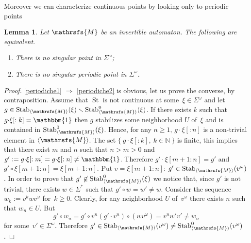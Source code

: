 \documentclass{amsart}
\newtheorem{lemma}[theorem]{Lemma}
\begin{document}
Moreover we can characterize continuous points by looking only to periodic points
\begin{lemma}\label{lemmaperiodiche}
Let ${{{\mathrsfs{{M}}}}}$ be an invertible automaton. The following are equivalent.
\begin{enumerate}[label=(\roman{enumi})]
\item \label{periodiche1} There is no singular point in ${{{\Sigma}}}^{\omega}$;
\item \label{periodiche2} There is no singular periodic point in ${{{\Sigma}}}^{\omega}$.
\end{enumerate}
\end{lemma}
\begin{proof}
 \ref{periodiche1} $\Rightarrow$ \ref{periodiche2}  is obvious, let us prove the converse, by contraposition.
 Assume that $\operatorname{St}$ is not continuous at some~$\xi\in {{{\Sigma}}}^{\omega}$ and let $g\in \operatorname{Stab}_{{{\langle}{{\mathrsfs{{{M}}}}}{\rangle}}}(\xi)\smallsetminus \operatorname{Stab}_{{{\langle}{{\mathrsfs{{{M}}}}}{\rangle}}}^{0}(\xi)$. If there exists $k$ such that $g{{{\cdot}}} \xi[:k]=\operatorname{\mathbbm{1}}$ then $g$ stabilizes some neighborhood $U$ of~$\xi$ and  is contained in $\operatorname{Stab}_{{{\langle}{{\mathrsfs{{{M}}}}}{\rangle}}}^{0}(\xi)$. Hence, for any $n\geq 1$, $g{{{\cdot}}} \xi[:n]$ is a non-trivial element in ${{{\langle}{{\mathrsfs{{{M}}}}}{\rangle}}}$. The set $\{\ g{{{\cdot}}} \xi[:k], \ k\in \mathbb{N}\ \}$ is finite, this implies that there exist $m$ and $n$ such that $n>m>0$ and  $g':=g{{{\cdot}}} \xi[:m]= g{{{\cdot}}} \xi[:n]\neq \operatorname{\mathbbm{1}}$. Therefore $g'{{{\cdot}}} \xi[m+1:n]=g'$ and $g'{{{\circ}}} \xi[m+1:n]=\xi[m+1:n]$. Put $v=\xi[m+1:n]$: $g'\in \operatorname{Stab}_{{{\langle}{{\mathrsfs{{{M}}}}}{\rangle}}}(v^{\omega})$. In order to prove that $g'\not\in \operatorname{Stab}_{{{\langle}{{\mathrsfs{{{M}}}}}{\rangle}}}^{0}(\xi)$ we notice that, since $g'$ is not trivial, there exists $w\in {{{\Sigma}}}^{\ast}$ such that $g'{{{\circ}}} w=w'\neq w$.  Consider the sequence $w_k:=v^kwv^{\omega}$ for~$k \geq 0$. Clearly, for any neighborhood $U$ of~$v^{\omega}$ there exists $n$ such that $w_n\in U$. But
$$
g'{{{\circ}}} w_n= g'{{{\circ}}} v^n (g'{{{\cdot}}} v^n){{{\circ}}} (wv^{\omega})=v^nw'v'\neq w_n
$$
for some~$v' \in {{{\Sigma}}}^{\omega}$. Therefore $g'\in \operatorname{Stab}_{{{\langle}{{\mathrsfs{{{M}}}}}{\rangle}}}(v^{\omega})\neq \operatorname{Stab}_{{{\langle}{{\mathrsfs{{{M}}}}}{\rangle}}}^{0}(v^{\omega})$.
\end{proof}
\end{document}

